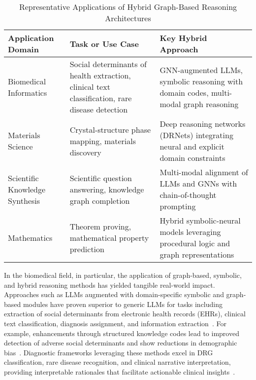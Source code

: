 \documentclass[11pt]{article}
\begin{document}
\begin{table}[ht]
\centering
\caption{Representative Applications of Hybrid Graph-Based Reasoning Architectures}
\label{tab:domain_applications}
\begin{tabular}{|p{4cm}|p{5cm}|p{4cm}|}
\hline
\textbf{Application Domain} & \textbf{Task or Use Case} & \textbf{Key Hybrid Approach} \\
\hline
Biomedical Informatics & Social determinants of health extraction, clinical text classification, rare disease detection & GNN-augmented LLMs, symbolic reasoning with domain codes, multi-modal graph reasoning \\
\hline
Materials Science & Crystal-structure phase mapping, materials discovery & Deep reasoning networks (DRNets) integrating neural and explicit domain constraints \\
\hline
Scientific Knowledge Synthesis & Scientific question answering, knowledge graph completion & Multi-modal alignment of LLMs and GNNs with chain-of-thought prompting \\
\hline
Mathematics & Theorem proving, mathematical property prediction & Hybrid symbolic-neural models leveraging procedural logic and graph representations \\
\hline
\end{tabular}
\end{table}

In the biomedical field, in particular, the application of graph-based, symbolic, and hybrid reasoning methods has yielded tangible real-world impact. Approaches such as LLMs augmented with domain-specific symbolic and graph-based modules have proven superior to generic LLMs for tasks including extraction of social determinants from electronic health records (EHRs), clinical text classification, diagnosis assignment, and information extraction~\cite{reference1,reference2,reference3,reference4,reference5,reference15,reference18,reference19,reference36,reference43,reference45,reference47,reference49,reference50,reference53,reference55,reference61,reference62,reference89,reference94,reference95}. For example, enhancements through structured knowledge codes lead to improved detection of adverse social determinants and show reductions in demographic bias~\cite{reference1,reference2,reference53,reference61}. Diagnostic frameworks leveraging these methods excel in DRG classification, rare disease recognition, and clinical narrative interpretation, providing interpretable rationales that facilitate actionable clinical insights~\cite{reference4,reference5,reference36,reference43,reference45,reference47,reference50,reference53,reference62,reference94,reference95}.
\end{document}
